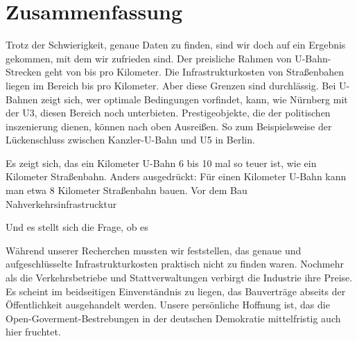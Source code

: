 \chapter{Zusammenfassung}




Trotz der Schwierigkeit, genaue Daten zu finden, sind wir doch auf ein Ergebnis gekommen, mit dem wir zufrieden sind. Der preisliche Rahmen von U-Bahn-Strecken geht von  bis  pro Kilometer. Die Infrastrukturkosten von Straßenbahen liegen im Bereich  bis  pro Kilometer. Aber diese Grenzen sind durchlässig. Bei U-Bahnen zeigt sich, wer optimale Bedingungen vorfindet, kann, wie Nürnberg mit der U3, diesen Bereich noch unterbieten. Prestigeobjekte, die der politischen inszenierung dienen, können nach oben Ausreißen. So zum Beispielsweise der Lückenschluss zwischen Kanzler-U-Bahn und U5 in Berlin. 

Es zeigt sich, das ein Kilometer U-Bahn 6 bis 10 mal so teuer ist, wie ein Kilometer Straßenbahn. Anders ausgedrückt: Für einen Kilometer U-Bahn kann man etwa 8 Kilometer Straßenbahn bauen. Vor dem Bau Nahverkehrsinfrastrucktur

Und es stellt sich die Frage, ob es  


Während unserer Recherchen mussten wir feststellen, das genaue und aufgeschlüsselte Infrastrukturkosten praktisch nicht zu finden waren. Nochmehr als die Verkehrsbetriebe und Stattverwaltungen verbirgt die Industrie ihre Preise. Es scheint im beidseitigen Einverständnis zu liegen, das Bauverträge abseits der Öffentlichkeit ausgehandelt werden. Unsere persönliche Hoffnung ist, das die Open-Goverment-Bestrebungen in der deutschen Demokratie mittelfristig auch hier fruchtet. 